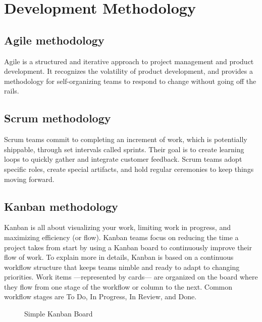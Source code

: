 \newpage

\section{Development Methodology}
\subsection{Agile methodology}
Agile is a structured and iterative approach to project management and product development.
It recognizes the volatility of product development, and provides a methodology for self-organizing teams to respond to change without going off the rails.

\subsection{Scrum methodology}
Scrum teams commit to completing an increment of work, which is potentially shippable, through set intervals called sprints.
Their goal is to create learning loops to quickly gather and integrate customer feedback.
Scrum teams adopt specific roles, create special artifacts, and hold regular ceremonies to keep things moving forward.

\subsection{Kanban methodology}
Kanban is all about visualizing your work, limiting work in progress, and maximizing efficiency (or flow).
Kanban teams focus on reducing the time a project takes from start by using a Kanban board to continuously improve their flow of work.
To explain more in details, Kanban is based on a continuous workflow structure that keeps teams nimble and ready to adapt to changing priorities.
Work items —represented by cards— are organized on the board where they flow from one stage of the workflow or column to the next.
Common workflow stages are To Do, In Progress, In Review, and Done.

\begin{figure}[H]
    \centering
    \caption{Simple Kanban Board}
    \label{fig:simple-kanban-board}
\end{figure}

